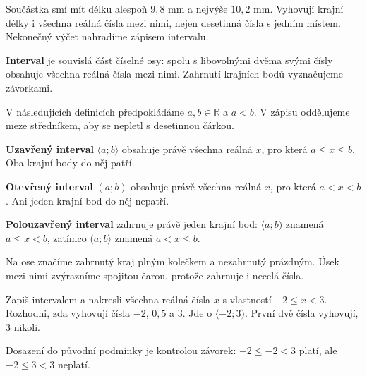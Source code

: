 \documentclass[11pt,a4paper]{article}
\begin{document}

Součástka smí mít délku alespoň $9{,}8$ mm a nejvýše $10{,}2$ mm.
Vyhovují krajní délky i všechna reálná čísla mezi nimi, nejen desetinná
čísla s jedním místem. Nekonečný výčet nahradíme zápisem intervalu.

\begin{definiceBox}[title={Definice - Interval}]
\textbf{Interval} je souvislá část číselné osy: spolu s libovolnými dvěma
svými čísly obsahuje všechna reálná čísla mezi nimi.
Zahrnutí krajních bodů vyznačujeme závorkami.
\end{definiceBox}

V následujících definicích předpokládáme $a,b\in\mathbb R$ a $a<b$.
V zápisu oddělujeme meze středníkem, aby se nepletl s desetinnou čárkou.

\begin{definiceBox}[title={Definice - Uzavřený interval}]
\textbf{Uzavřený interval} $\langle a;b\rangle$ obsahuje právě všechna
reálná $x$, pro která $a\le x\le b$. Oba krajní body do něj patří.
\end{definiceBox}

\begin{definiceBox}[title={Definice - Otevřený interval}]
\textbf{Otevřený interval} $(a;b)$ obsahuje právě všechna reálná $x$,
pro která $a<x<b$. Ani jeden krajní bod do něj nepatří.
\end{definiceBox}

\begin{definiceBox}[title={Definice - Polouzavřený interval}]
\textbf{Polouzavřený interval} zahrnuje právě jeden krajní bod:
$\langle a;b)$ znamená $a\le x<b$, zatímco $(a;b\rangle$ znamená $a<x\le b$.
\end{definiceBox}

Na ose značíme zahrnutý kraj plným kolečkem a nezahrnutý prázdným.
Úsek mezi nimi zvýrazníme spojitou čarou, protože zahrnuje i necelá čísla.

\begin{prikladReseniBox}[title={Příklad 1},breakable=false]
Zapiš intervalem a nakresli všechna reálná čísla $x$ s vlastností $-2\le x<3$.
Rozhodni, zda vyhovují čísla $-2$, $0{,}5$ a $3$.
\tcblower
Jde o $\langle-2;3)$. První dvě čísla vyhovují, $3$ nikoli.
\begin{center}
\end{center}
Dosazení do původní podmínky je kontrolou závorek:
$-2\le-2<3$ platí, ale $-2\le3<3$ neplatí.
\end{prikladReseniBox}
\end{document}
